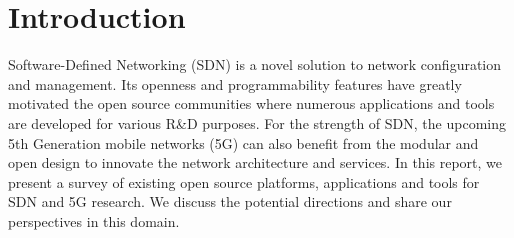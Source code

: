 \section{Introduction}

Software-Defined Networking (SDN) is a novel solution to network configuration and management. Its openness and programmability features have greatly motivated the open source communities where numerous applications and tools are developed for various R\&D purposes. For the strength of SDN, the upcoming 5th Generation mobile networks (5G) can also benefit from the modular and open design to innovate the network architecture and services. In this report, we present a survey of existing open source platforms, applications and tools for SDN and 5G research. We discuss the potential directions and share our perspectives in this domain.
